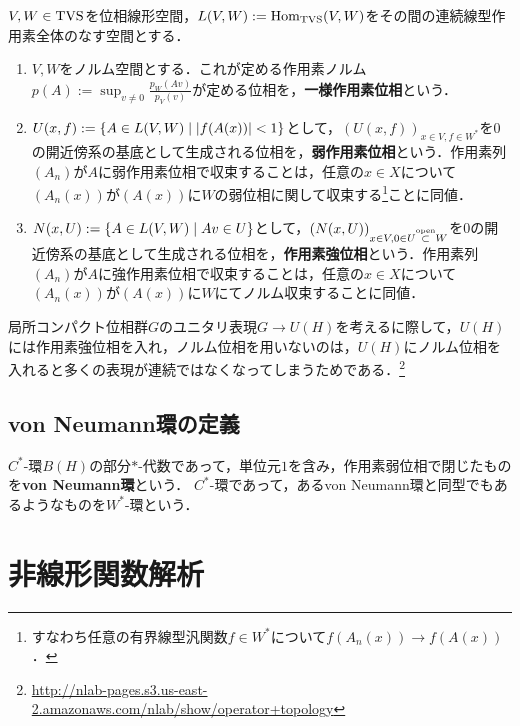 \documentclass[uplatex,dvipdfmx]{jsreport}
\begin{document}
\begin{definition}
    $V,W\in\mathrm{TVS}$を位相線形空間，$L(V,W):=\mathrm{Hom}_{\mathrm{TVS}}(V,W)$をその間の連続線型作用素全体のなす空間とする．
    \begin{enumerate}
        \item $V,W$をノルム空間とする．これが定める作用素ノルム$p(A):=\sup_{v\ne0}\frac{p_W(Av)}{p_V(v)}$が定める位相を，\textbf{一様作用素位相}という．
        \item $U(x,f):=\left\{A\in L(V,W)\mid\lvert f(A(x))\rvert<1\right\}$として，$(U(x,f))_{x\in V,f\in W^*}$を$0$の開近傍系の基底として生成される位相を，\textbf{弱作用素位相}という．作用素列$(A_n)$が$A$に弱作用素位相で収束することは，任意の$x\in X$について$(A_n(x))$が$(A(x))$に$W$の弱位相に関して収束する\footnote{すなわち任意の有界線型汎関数$f\in W^*$について$f(A_n(x))\to f(A(x))$．}ことに同値．
        \item $N(x,U):=\left\{A\in L(V,W)\mid Av\in U\right\}$として，$(N(x,U))_{x\in V,0\in U\overset{\mathrm{open}}{\subset} W}$を$0$の開近傍系の基底として生成される位相を，\textbf{作用素強位相}という．作用素列$(A_n)$が$A$に強作用素位相で収束することは，任意の$x\in X$について$(A_n(x))$が$(A(x))$に$W$にてノルム収束することに同値．
    \end{enumerate}
\end{definition}

\begin{remark}
    局所コンパクト位相群$G$のユニタリ表現$G\to U(H)$を考えるに際して，$U(H)$には作用素強位相を入れ，ノルム位相を用いないのは，$U(H)$にノルム位相を入れると多くの表現が連続ではなくなってしまうためである．\footnote{\url{http://nlab-pages.s3.us-east-2.amazonaws.com/nlab/show/operator+topology}}
\end{remark}

\section{von Neumann環の定義}

\begin{definition}
    $C^*$-環$B(H)$の部分$*$-代数であって，単位元$1$を含み，作用素弱位相で閉じたものを\textbf{von Neumann環}という．
    $C^*$-環であって，あるvon Neumann環と同型でもあるようなものを$W^*$-環という．
\end{definition}

\chapter{非線形関数解析}
\end{document}

